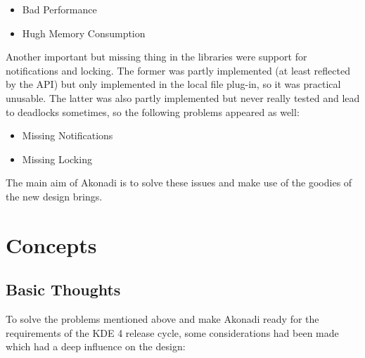 \documentclass[]{report}
\begin{document}
\begin{itemize}
  \item Bad Performance
  \item Hugh Memory Consumption
\end{itemize}

Another important but missing thing in the libraries were support for notifications and locking.
The former was partly implemented (at least reflected by the API) but only implemented in the local
file plug-in, so it was practical unusable. The latter was also partly implemented but never really tested and
lead to deadlocks sometimes, so the following problems appeared as well:

\begin{itemize}
  \item Missing Notifications
  \item Missing Locking
\end{itemize}

The main aim of Akonadi is to solve these issues and make use of the goodies of the new design brings.

\chapter{Concepts}

\section{Basic Thoughts}

To solve the problems mentioned above and make Akonadi ready for the requirements of the KDE 4 release
cycle, some considerations had been made which had a deep influence on the design:
\end{document}
